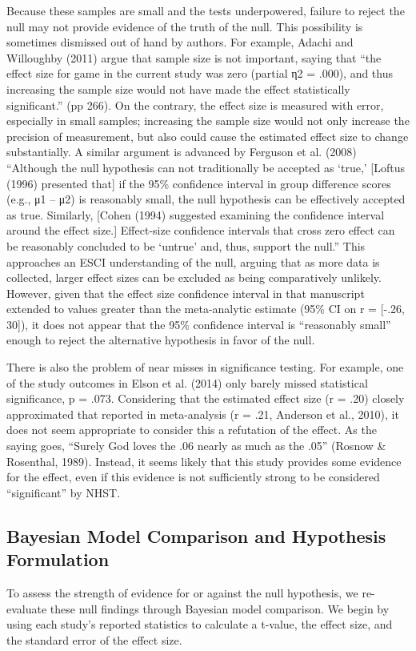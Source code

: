 \documentclass[fignum,nobf,man]{apa}
\begin{document}
Because these samples are small and the tests underpowered, failure to reject the null may not provide evidence of the truth of the null.  This possibility is sometimes dismissed out of hand by authors. For example, Adachi and Willoughby (2011) argue that sample size is not important, saying that ``the effect size for game in the current study was zero (partial η2 = .000), and thus increasing the sample size would not have made the effect statistically significant.'' (pp 266).  On the contrary, the effect size is measured with error, especially in small samples; increasing the sample size would not only increase the precision of measurement, but also could cause the estimated effect size to change substantially. A similar argument is advanced by Ferguson et al. (2008) ``Although the null hypothesis can not traditionally be accepted as `true,' [Loftus (1996) presented that] if the 95\% confidence interval in group difference scores (e.g., μ1 – μ2) is reasonably small, the null hypothesis can be effectively accepted as true. Similarly, [Cohen (1994) suggested examining the confidence interval around the effect size.] Effect-size confidence intervals that cross zero effect can be reasonably concluded to be ‘untrue’ and, thus, support the null.''   This approaches an ESCI understanding of the null, arguing that as more data is collected, larger effect sizes can be excluded as being comparatively unlikely. However, given that the effect size confidence interval in that manuscript extended to values greater than the meta-analytic estimate (95\% CI on r = [-.26, 30]), it does not appear that the 95\% confidence interval is ``reasonably small'' enough to reject the alternative hypothesis in favor of the null.

There is also the problem of near misses in significance testing. For example, one of the study outcomes in Elson et al. (2014) only barely missed statistical significance, p = .073. Considering that the estimated effect size (r = .20) closely approximated that reported in meta-analysis (r = .21, Anderson et al., 2010), it does not seem appropriate to consider this a refutation of the effect. As the saying goes, ``Surely God loves the .06 nearly as much as the .05'' (Rosnow \& Rosenthal, 1989). Instead, it seems likely that this study provides some evidence for the effect, even if this evidence is not sufficiently strong to be considered ``significant'' by NHST. 

\subsection{Bayesian Model Comparison and Hypothesis Formulation}
To assess the strength of evidence for or against the null hypothesis, we re-evaluate these null findings through Bayesian model comparison. We begin by using each study’s reported statistics to calculate a t-value, the effect size, and the standard error of the effect size.
\end{document}
